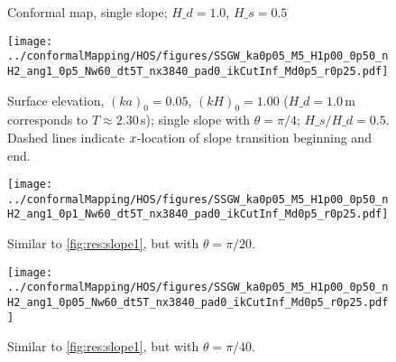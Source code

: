 \begin{figure}[h!ptb]%
\centering
{}%
%
%
\caption{Conformal map, single slope; $H\_d = 1.0$, $H\_s = 0.5$}%
\label{fig:res:map_slope}%
\end{figure}

\begin{figure}[h!ptb]%
\centering
\texttt{[image: ../conformalMapping/HOS/figures/SSGW\_ka0p05\_M5\_H1p00\_0p50\_nH2\_ang1\_0p5\_Nw60\_dt5T\_nx3840\_pad0\_ikCutInf\_Md0p5\_r0p25.pdf]}%
\caption{Surface elevation, $(ka)_0 = 0.05$, $(kH)_0 = 1.00$ ($H\_d=1.0$\,m corresponds to $T\approx2.30$\,s); single slope with $\theta=\pi/4$; $H\_s/H\_d = 0.5$. Dashed lines indicate $x$-location of slope transition beginning and end.}%
\label{fig:res:slope1}%
\end{figure}
\begin{figure}[h!ptb]%
\centering 
\texttt{[image: ../conformalMapping/HOS/figures/SSGW\_ka0p05\_M5\_H1p00\_0p50\_nH2\_ang1\_0p1\_Nw60\_dt5T\_nx3840\_pad0\_ikCutInf\_Md0p5\_r0p25.pdf]}%
\caption{Similar to \autoref{fig:res:slope1}, but with $\theta=\pi/20$.}%
\label{fig:res:slope2}%
\end{figure}
\begin{figure}[h!ptb]%
\centering 															  
\texttt{[image: ../conformalMapping/HOS/figures/SSGW\_ka0p05\_M5\_H1p00\_0p50\_nH2\_ang1\_0p05\_Nw60\_dt5T\_nx3840\_pad0\_ikCutInf\_Md0p5\_r0p25.pdf]}%
\caption{Similar to \autoref{fig:res:slope1}, but with $\theta=\pi/40$.}%
\label{fig:res:slope3}%
\end{figure}








%